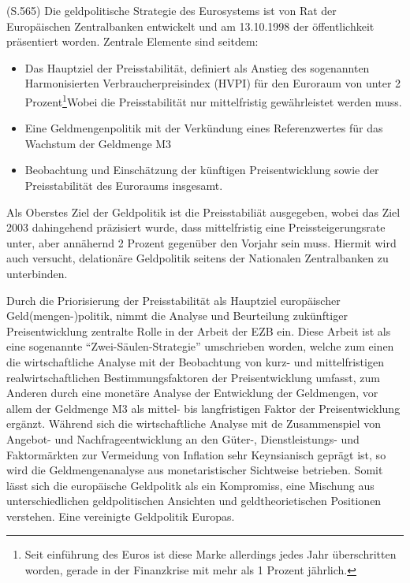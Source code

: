 \documentclass[
  onecolumn,
  a4paper,
  abstracton,
  parskip=half
  ,final
  ]{scrartcl}
\begin{document}
(S.565)
Die geldpolitische Strategie des Eurosystems ist von Rat der Europ{\"a}ischen Zentralbanken entwickelt und am 13.10.1998 der {\"o}ffentlichkeit pr{\"a}sentiert worden.
Zentrale Elemente sind seitdem:
\begin{itemize}
  \item{Das Hauptziel der Preisstabilit{\"a}t, definiert als Anstieg des sogenannten Harmonisierten Verbraucherpreisindex (HVPI) f{\"u}r den Euroraum von unter 2 Prozent\footnote[78]{Seit einf{\"u}hrung des Euros ist diese Marke allerdings jedes Jahr {\"u}berschritten worden, gerade in der Finanzkrise mit mehr als 1 Prozent j{\"a}hrlich.}Wobei die Preisstabilit{\"a}t nur mittelfristig gew{\"a}hrleistet werden muss. %
  }
  \item{Eine Geldmengenpolitik mit der Verk{\"u}ndung eines Referenzwertes f{\"u}r das Wachstum der Geldmenge M3}
  \item{Beobachtung und Einsch{\"a}tzung der k{\"u}nftigen Preisentwicklung sowie der Preisstabilit{\"a}t des Euroraums insgesamt.}
\end{itemize}
Als Oberstes Ziel der Geldpolitik ist die Preisstabili{\"a}t ausgegeben, wobei das Ziel 2003 dahingehend pr{\"a}zisiert wurde, dass mittelfristig eine Preissteigerungsrate unter, aber ann{\"a}hernd 2 Prozent gegen{\"u}ber den Vorjahr sein muss. Hiermit wird auch versucht, delation{\"a}re Geldpolitik seitens der Nationalen Zentralbanken zu unterbinden.


\citep[vgl.][S.558f]{Basseler2010}

Durch die Priorisierung der Preisstabilit{\"a}t als Hauptziel europ{\"a}ischer Geld(mengen-)politik, nimmt die Analyse und Beurteilung zuk{\"u}nftiger Preisentwicklung zentralte Rolle in der Arbeit der EZB ein. Diese Arbeit ist als eine sogenannte "`Zwei-S{\"a}ulen-Strategie"' umschrieben worden\citep[S.568]{Basseler2010}, welche zum einen die wirtschaftliche Analyse mit der Beobachtung von kurz- und mittelfristigen realwirtschaftlichen Bestimmungsfaktoren der Preisentwicklung umfasst,
zum Anderen durch eine monet{\"a}re Analyse der Entwicklung der Geldmengen, vor allem der Geldmenge M3 als mittel- bis langfristigen Faktor der Preisentwicklung erg{\"a}nzt.
W{\"a}hrend sich die wirtschaftliche Analyse mit de Zusammenspiel von Angebot- und Nachfrageentwicklung an den G{\"u}ter-, Dienstleistungs- und Faktorm{\"a}rkten zur Vermeidung von Inflation sehr Keynsianisch gepr{\"a}gt ist, so wird die Geldmengenanalyse aus monetaristischer Sichtweise betrieben\citep[S.568]{Basseler2010}. Somit l{\"a}sst sich die europ{\"a}ische Geldpolitk als ein Kompromiss, eine Mischung aus unterschiedlichen geldpolitischen Ansichten und geldtheorietischen Positionen verstehen. Eine vereinigte Geldpolitik Europas.
\end{document}
